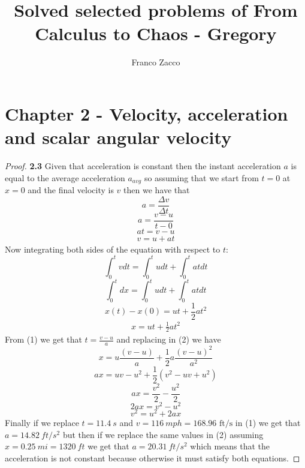 \documentclass[11pt]{article}
\title{\textbf{Solved selected problems of From Calculus to Chaos - Gregory}}
\author{Franco Zacco}
\date{}
\begin{document}
\maketitle
\thispagestyle{empty}

\section*{Chapter 2 - Velocity, acceleration and scalar angular velocity}

	\begin{proof}{\textbf{2.3}} Given that acceleration is constant then the
        instant acceleration $a$ is equal to the average acceleration $a_{avg}$
        so assuming that we start from $t=0$ at $x=0$ and the final velocity
        is $v$ then we have that
        $$a = \frac{\Delta v}{\Delta t}$$
        $$a = \frac{v - u}{t - 0}$$
        $$at = v - u$$
        \begin{align}
            v = u + at
        \end{align}
        Now integrating both sides of the equation with respect to $t$:
        $$\int_0^t{vdt}=\int_0^t{udt}+\int_0^t{atdt}$$
        $$\int_{0}^t{dx}=\int_0^t{udt}+\int_0^t{atdt}$$
        $$x(t) - x(0) = ut + \frac{1}{2}at^2$$
        \begin{align}
            x = ut + \frac{1}{2}at^2
        \end{align}
        From (1) we get that $t = \frac{v-u}{a}$ and replacing in (2) we have
        $$x = u\frac{(v-u)}{a} + \frac{1}{2}a\frac{(v-u)^2}{a^2}$$
        $$ax = uv - u^2 + \frac{1}{2}(v^2 - uv + u^2)$$
        $$ax = \frac{v^2}{2} - \frac{u^2}{2}$$
        $$2ax = v^2 - u^2$$
        $$v^2 = u^2 + 2ax$$
        Finally if we replace $t=11.4~\si{s}$ and
        $v=116~\si{mph}=168.96\text{ ft/s}$ in (1) we get that
        $a = 14.82~\si{ ft/s^2}$ but then if we replace the same values in (2)
        assuming $x=0.25~\si{mi} =1320~\si{ft}$ we get that
        $a = 20.31~\si{ft/s^2}$ which means that the acceleration is not 
        constant because otherwise it must satisfy both equations.
    \end{proof}
\end{document}

